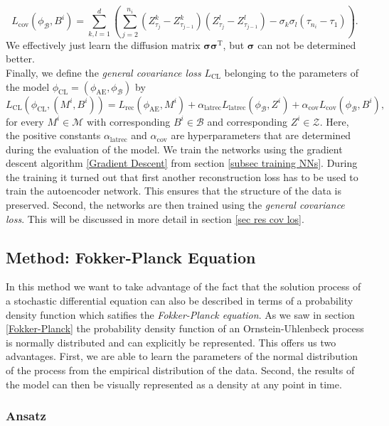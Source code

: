 \documentclass[11pt,titlepage]{article}
\theoremstyle{definition}
\theoremstyle{remark}
\begin{document}
	\[L_\mathrm{cov}(\phi_\mathcal{B}, B^i) = \sum_{k,l=1}^d \left(\sum_{j=2}^{n_i} \left(Z^k_{\tau_{j}}-Z^k_{\tau_{j-1}}\right)\left(Z^l_{\tau_{j}}-Z^l_{\tau_{j-1}}\right)-\sigma_k\sigma_l(\tau_{n_i}-\tau_1)\right).\]
	We effectively just learn the diffusion matrix $\boldsymbol{\sigma} \boldsymbol{\sigma}^\text{T}$, but $\boldsymbol{\sigma}$ can not be determined better. \\
	Finally, we define the \textsl{general covariance loss} $L_\mathrm{CL}$ belonging to the parameters of the model $\phi_\mathrm{CL} = (\phi_\mathrm{AE},\phi_\mathcal{B})$ by
	\[L_\mathrm{CL}(\phi_\mathrm{CL}, (M^i, B^i)) = L_\mathrm{rec}(\phi_{\mathrm{AE}}, M^i) + \alpha_\mathrm{latrec} L_\mathrm{latrec}(\phi_\mathcal{B}, Z^i) + \alpha_\mathrm{cov}L_\mathrm{cov}(\phi_\mathcal{B}, B^i),\]
	for every $M^i\in\mathcal{M}$ with corresponding $B^i\in\mathcal{B}$ and corresponding $Z^i\in\mathcal{Z}$. Here, the positive constants $\alpha_\mathrm{latrec}$ and $\alpha_\mathrm{cov}$ are hyperparameters that are determined during the evaluation of the model. We train the networks using the gradient descent algorithm \ref{Gradient Descent} from section \ref{subsec training NNs}. During the training it turned out that first another reconstruction loss has to be used to train the autoencoder network. This ensures that the structure of the data is preserved. Second, the networks are then trained using the  \textsl{general covariance loss}. This will be discussed in more detail in section \ref{sec res cov los}.
	
	\clearpage
	\subsection{Method: Fokker-Planck Equation}\label{sec Method Fokker-Planck}
	
	In this method we want to take advantage of the fact that the solution process of a 
	stochastic differential equation can also be described in terms of a probability 
	density function which satifies the \textsl{Fokker-Planck equation}. 
	As we saw in section \ref{Fokker-Planck} the probability density function of an Ornstein-Uhlenbeck process is 
	normally distributed and can explicitly be represented. This offers us two advantages. First, we are able to learn the parameters of the normal distribution of the process from the empirical distribution of the data. Second, the results of the model can then be visually represented as a density at any point in time.
	
	\subsubsection*{Ansatz}
	
\end{document}
